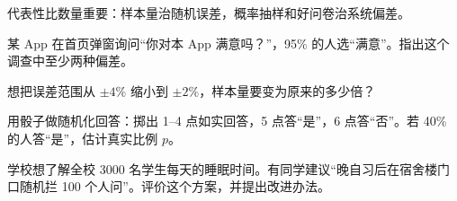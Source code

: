 \begin{oneline}
代表性比数量重要：样本量治随机误差，概率抽样和好问卷治系统偏差。
\end{oneline}

\begin{exercises}[练一练]
  \item 某 App 在首页弹窗询问“你对本 App 满意吗？”，95\% 的人选“满意”。指出这个调查中至少两种偏差。
  \item 想把误差范围从 $\pm4\%$ 缩小到 $\pm2\%$，样本量要变为原来的多少倍？
  \item 用骰子做随机化回答：掷出 1--4 点如实回答，5 点答“是”，6 点答“否”。若 40\% 的人答“是”，估计真实比例 $p$。
  \item 学校想了解全校 3000 名学生每天的睡眠时间。有同学建议“晚自习后在宿舍楼门口随机拦 100 个人问”。评价这个方案，并提出改进办法。
\end{exercises}
